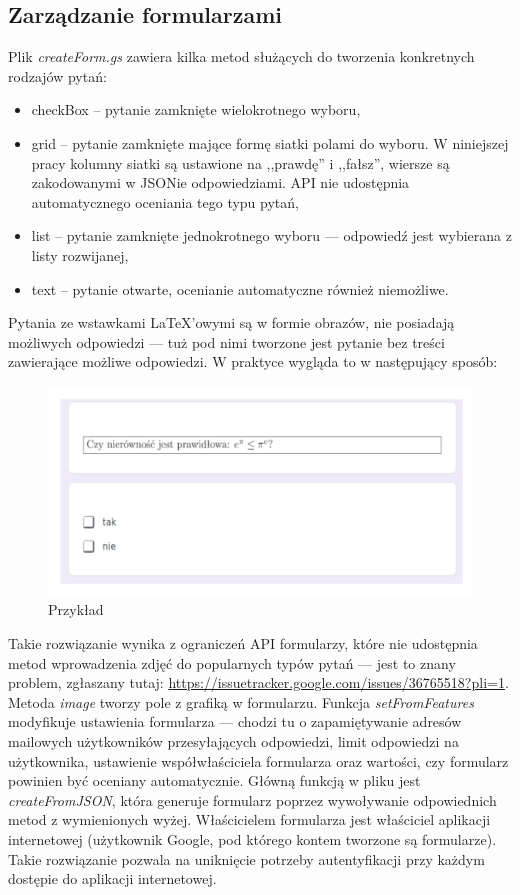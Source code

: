 \subsection{Zarządzanie formularzami}
Plik \textit{createForm.gs} zawiera kilka metod służących do tworzenia konkretnych rodzajów pytań:
\begin{itemize}
\item checkBox -- pytanie zamknięte wielokrotnego wyboru,
\item grid -- pytanie zamknięte mające formę siatki polami do wyboru. W niniejszej pracy kolumny siatki są ustawione na ,,prawdę'' i ,,fałsz'', wiersze są zakodowanymi w JSONie odpowiedziami. API nie udostępnia automatycznego oceniania tego typu pytań,
\item list -- pytanie zamknięte jednokrotnego wyboru --- odpowiedź jest wybierana z listy rozwijanej,
\item text -- pytanie otwarte, ocenianie automatyczne również niemożliwe.

\end{itemize}
Pytania ze wstawkami \LaTeX{}'owymi są w formie obrazów, nie posiadają możliwych odpowiedzi --- tuż pod nimi tworzone jest pytanie bez treści zawierające możliwe odpowiedzi. W praktyce wygląda to w następujący sposób:
\begin{figure}[H]
  
  \centering
  \includegraphics[scale=0.75]{przyklad.png}
  \caption{Przykład}
  \label{fig:1}
\end{figure}
Takie rozwiązanie wynika z ograniczeń  API formularzy, które nie udostępnia metod wprowadzenia zdjęć do popularnych typów pytań --- jest to znany problem, zgłaszany tutaj: \href{https://issuetracker.google.com/issues/36765518?pli=1}{https://issuetracker.google.com/issues/36765518?pli=1}. Metoda \textit{image} tworzy pole z grafiką w formularzu. 
Funkcja \textit{setFromFeatures} modyfikuje ustawienia formularza --- chodzi tu o zapamiętywanie adresów mailowych użytkowników przesyłających odpowiedzi, limit odpowiedzi na użytkownika, ustawienie współwłaściciela formularza oraz wartości, czy formularz powinien być oceniany automatycznie.
\ind Główną funkcją w pliku jest \textit{createFromJSON}, która generuje formularz poprzez wywoływanie odpowiednich metod z wymienionych wyżej. Właścicielem formularza jest właściciel aplikacji internetowej (użytkownik Google, pod którego  kontem tworzone są formularze). Takie rozwiązanie pozwala na uniknięcie potrzeby autentyfikacji przy każdym dostępie do aplikacji internetowej.

